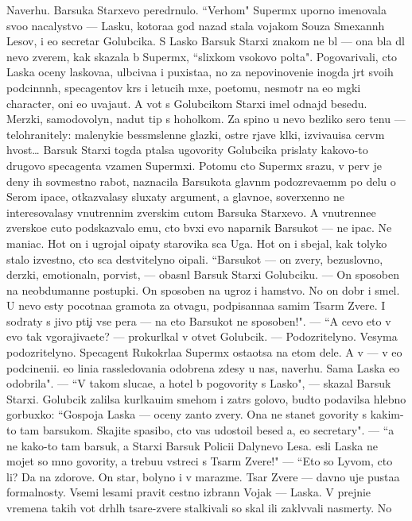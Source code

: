 \documentclass[12pt]{book}
\begin{document}
Naverhu. Barsuka Starxevo pered{\e}rnulo. ``Verhom" Superm{\yi}x uporno ime\-no\-va\-la svo{\y}o nacalystvo — Lasku, kotora{\y}a god nazad stala vojakom So{\y}uza Smexann{\yi}h Lesov, i {\y}e{\y}o secretar{\ia} Golubcika. S Lasko{\y} Barsuk Starxi{\y} znakom ne b{\yi}l — ona b{\yi}la dl{\ia} nevo zverem, kak skazala b{\yi} Superm{\yi}x, ``slixkom v{\yi}sokovo pol{\e}ta". Pogovarivali, cto Laska oceny laskova{\y}a, ul{\yi}bciva{\y}a i puxista{\y}a, no za nepovinoveni{\y}e inogda jr{\e}t svo{\y}ih podcin{\e}nn{\yi}h, specagentov kr{\yi}s i letucih m{\yi}xe{\y}, poetomu, nesmotr{\ia} na {\y}e{\y}o m{\ia}gki{\y} character, oni {\y}e{\y}o uvaja{\y}ut. A vot s Golubcikom Starxi{\y} imel odnajd{\yi} besedu. Merzki{\y}, samodovolyn{\yi}{\y}, nadut{\yi}{\y} tip s hoholkom. Za spino{\y} u nevo bezliko{\y} sero{\y} ten{\y}u — telohranitely: malenyki{\y}e bessm{\yi}slenn{\yi}{\y}e glazki, ostr{\yi}{\y}e rjav{\yi}{\y}e kl{\yi}ki, izviva{\y}u{\x}i{\y}sa cerv{\e}m hvost… Barsuk Starxi{\y} togda p{\yi}talsa ugovority Golubcika prislaty kakovo-to drugovo specagenta vzamen Superm{\yi}xi. Potomu cto Superm{\yi}x srazu, v perv{\yi}{\y} je deny ih sovmestno{\y} rabot{\yi}, naznacila Barsukota glavn{\yi}m podozreva{\y}em{\yi}m po delu o Serom {\X}ipace, otkaz{\yi}valasy sluxaty argument{\yi}, a glavno{\y}e, soverxenno ne interesovalasy vnutrennim zverskim cut{\y}om Barsuka Starxevo. A vnutrenne{\y}e zversko{\y}e cut{\y}o podskaz{\yi}valo {\y}emu, cto b{\yi}vxi{\y} {\y}evo naparnik Barsukot — ne {\X}ipac. Ne maniac. Hot{\ia} on i ugrojal o{\x}ipaty star{\y}ov{\x}ika s{\yi}ca Uga. Hot{\ia} on i sbejal, kak tolyko stalo izvestno, cto s{\yi}ca de{\y}stvitelyno o{\x}ipali. ``Barsukot — on zvery, bezuslovno, derzki{\y}, emo\-ti\-onal\-n{\yi}{\y}, por{\yi}vist{\yi}{\y}, — ob{\y}asn{\ia}l Barsuk Starxi{\y} Golubciku. — On sposoben na neobdumann{\yi}{\y}e postupki. On sposoben na ugroz{\yi} i hamstvo. No on dobr{\yi}{\y} i smel{\yi}{\y}. U nevo {\y}esty pocotna{\y}a gramota za otvagu, podpisanna{\y}a samim Tsar{\e}m Zvere{\y}. I sodraty s jivo{\y} pti{\c}i vse per{\y}a — na eto Barsukot ne sposoben!". — ``A cevo eto v{\yi} {\y}evo tak v{\yi}gorajiva{\y}ete? — prokurl{\yi}kal v otvet Golubcik. — Podozritelyno. Vesyma podozritelyno. Specagent Rukokr{\yi}la{\y}a Superm{\yi}x osta{\y}otsa na etom dele. A v{\yi} — v {\y}e{\y}o podcineni{\y}i. {\Y}e{\y}o lini{\y}a rassledovani{\y}a odobrena zdesy u nas, naverhu. Sama Laska {\y}e{\y}o odobrila". — ``V takom sluca{\y}e, {\y}a hotel b{\yi} pogovority s Lasko{\y}", — skazal Barsuk Starxi{\y}. Golubcik zalilsa kurl{\yi}ka{\y}u{\x}im smehom i zatr{\ia}s golovo{\y}, budto podavilsa hlebno{\y} gorbuxko{\y}: ``Gospoja Laska — oceny zan{\ia}to{\y} zvery. Ona ne stanet govority s kakim-to tam barsukom. Skajite spasibo, cto vas udostoil besed{\yi} {\y}a, {\y}e{\y}o secretary". — ``{\Y}a ne kako{\y}-to tam barsuk, a Starxi{\y} Barsuk Polici{\y}i Dalynevo Lesa. {\Y}esli Laska ne mojet so mno{\y} govority, {\y}a trebu{\y}u vstreci s Tsar{\e}m Zvere{\y}!" — ``Eto so Lyvom, cto li? Da na zdorov{\y}e. On star{\yi}{\y}, bolyno{\y} i v marazme. Tsar Zvere{\y} — davno uje pusta{\y}a formalnosty. Vsemi lesami pravit cestno izbrann{\yi}{\y} Vojak — Laska. V prejni{\y}e vremena takih vot dr{\ia}hl{\yi}h tsare{\y}-zvere{\y} stalkivali so skal{\yi} ili zakl{\e}v{\yi}vali nasmerty. No 
\end{document}
